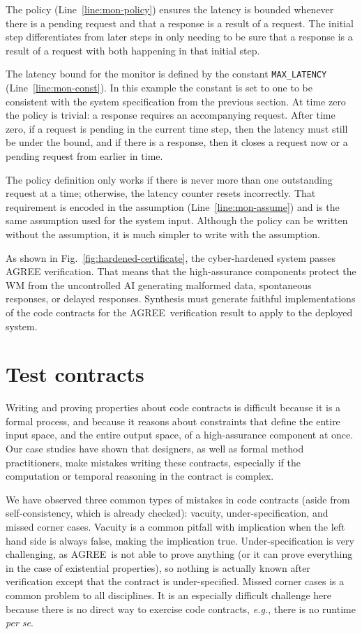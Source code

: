 \documentclass[global,twocolumn]{svjour}
\newcommand{\figref}[1]{Fig.~\ref{#1}}
\newcommand{\lineref}[1]{Line~\ref{#1}}
\newcommand{\agr}{AGREE}
\newcommand{\eg}{\textit{e.g.}}
\begin{document}
The policy (\lineref{line:mon-policy}) ensures the latency is bounded whenever there is a pending request and that a response is a result of a request.
%
The initial step differentiates from later steps in only needing to be sure that a response is a result of a request with both happening in that initial step.

The latency bound for the monitor is defined by the constant \texttt{MAX\_LATENCY} (\lineref{line:mon-const}).
%
In this example the constant is set to one to be consistent with the system specification from the previous section.
%
At time zero the policy is trivial: a response requires an accompanying request.
%
After time zero, if a request is pending in the current time step, then the latency must still be under the bound, and if there is a response, then it closes a request now or a pending request from earlier in time.

The policy definition only works if there is never more than one outstanding request at a time;
%
otherwise, the latency counter resets incorrectly.
%
That requirement is encoded in the assumption (\lineref{line:mon-assume}) and is the same assumption used for the system input.
%
Although the policy can be written without the assumption, it is much simpler to write with the assumption.

As shown in \figref{fig:hardened-certificate}, the cyber-hardened system passes AGREE verification.
%
That means that the high-assurance components protect the WM from the uncontrolled AI generating malformed data, spontaneous responses, or delayed responses.
%
Synthesis must generate faithful implementations of the code contracts for the \agr\ verification result to apply to the deployed system.


\section{Test contracts}
\label{sec:testing}

Writing and proving properties about code contracts is difficult because it is a formal process, and because it reasons about constraints that define the entire input space, and the entire output space, of a high-assurance component at once.
%
Our case studies have shown that designers, as well as formal method practitioners, make mistakes writing these contracts, especially if the computation or temporal reasoning in the contract is complex.

We have observed three common types of mistakes in code contracts (aside from self-consistency, which is already checked): vacuity, under-specification, and missed corner cases.
%
Vacuity is a common pitfall with implication when the left hand side is always false, making the implication true.
%
Under-specification is very challenging, as \agr\ is not able to prove anything (or it can prove everything in the case of existential properties), so nothing is actually known after verification except that the contract is under-specified.
%
Missed corner cases is a common problem to all disciplines.
%
It is an especially difficult challenge here because there is no direct way to exercise code contracts, \eg, there is no runtime \emph{per se}.
\end{document}
